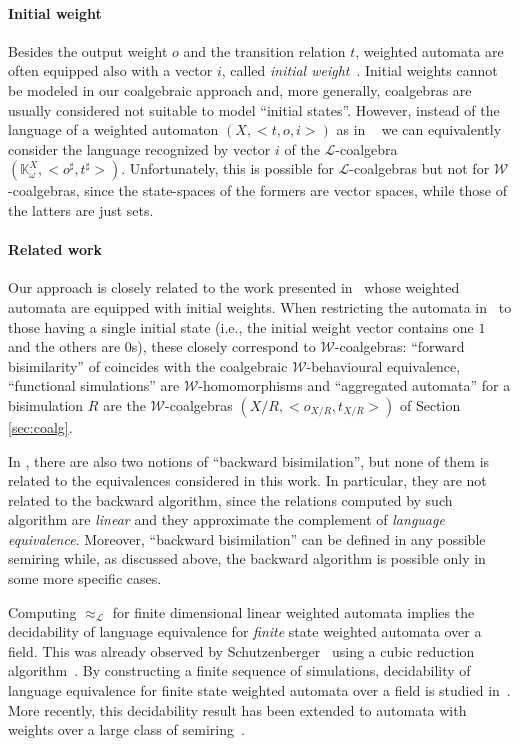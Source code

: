 \documentclass[3p]{elsarticle}
\newcommand{\fW}{\mathcal{W}}    %
\newcommand{\fL}{\mathcal{L}}    %
\newcommand{\K}{\mathbb{K}}            %
\newcommand{\mar}[1]{\marginpar{ \textbf{MaB:} {\footnotesize #1}}} %
\begin{document}
\paragraph{Initial weight}
Besides the output weight $o$ and the transition relation $t$, weighted automata are often equipped
also with a vector $i$, called \emph{initial weight}~\cite{Moh09}. Initial weights cannot
be modeled in our coalgebraic approach and, more generally, coalgebras are usually considered
not suitable to model ``initial states''. However, instead of the language of a weighted automaton $(X,<t,o,i>)$ as in ~\cite{Moh09}
we can equivalently consider the language recognized by vector $i$ of the $\fL$-coalgebra $(\K^X_{\omega}, <o^{\sharp},t^{\sharp}>)$.
Unfortunately, this is possible for $\fL$-coalgebras but not for $\fW$-coalgebras, since the state-spaces of the formers are vector spaces,
while those of the latters are just sets.

\paragraph{Related work}
Our approach is closely related to the work presented in~\cite{german} whose
weighted automata are equipped with initial weights.
When restricting the automata in~\cite{german} to those having a single initial state
(i.e., the initial weight vector contains one $1$ and the others are $0$s), these closely correspond to $\fW$-coalgebras:
``forward bisimilarity'' of \cite{german} coincides with the coalgebraic $\fW$-behavioural equivalence, ``functional simulations'' are
$\fW$-homomorphisms  and ``aggregated automata'' for a bisimulation $R$ are the $\fW$-coalgebras $(X/R, <o_{X/R},t_{X/R}>)$ of
Section \ref{sec:coalg}.

In \cite{german}, there are also two notions of ``backward bisimilation'', but none of them
is related to the equivalences considered in this work. In particular, they are not related to the backward algorithm,
since the relations computed by such algorithm are \emph{linear} and they approximate the complement of \emph{language equivalence}.
Moreover, ``backward bisimilation'' can be defined in any possible semiring while, as discussed above, the backward algorithm
is possible only in some more specific cases.

Computing $\approx_{\fL}$ for finite dimensional linear weighted automata
implies the decidability of language equivalence for \emph{finite} state weighted automata
over a field. This was already observed by Schutzenberger~\cite{Schutzenberger61b}
using a cubic reduction algorithm~\cite{BR-series}. By constructing a finite sequence
of simulations, decidability of language equivalence for  finite state weighted automata
over a field is studied in~\cite{BLS06}. More recently, this decidability result has been
extended to automata with weights over a large class of semiring~\cite{EM2010}.
\end{document}
